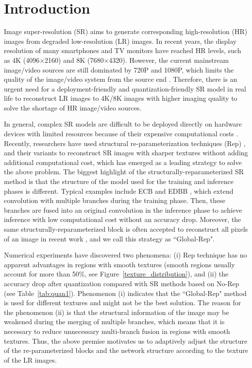\documentclass[sn-mathphys]{sn-jnl}%
\theoremstyle{thmstyleone}%
\theoremstyle{thmstyletwo}%
\theoremstyle{thmstylethree}%
\begin{document}
\maketitle

\section{Introduction}\label{sec1}
Image super-resolution (SR) aims to generate corresponding high-resolution (HR) images from degraded low-resolution (LR) images. In recent years, the display resolution of many smartphones and TV monitors have reached HR levels, such as 4K (4096$\times$2160) and 8K (7680$\times$4320). However, the current mainstream image/video sources are still dominated by 720P and 1080P, which limits the quality of the image/video system from the source end \cite{EGVSR,mobile2,mobile3,ARM}. Therefore, there is an urgent need for a deployment-friendly and quantization-friendly SR model in real life to reconstruct LR images to 4K/8K images with higher imaging quality to solve the shortage of HR image/video sources.

In general, complex SR models are difficult to be deployed directly on hardware devices with limited resources because of their expensive computational costs \cite{mobile1,RealBasicVSR,basicvsr++,CBAM,DRRN,RCAN,liu2022cross,yang2021image,MFFN}. Recently, researchers have used structural re-parameterization techniques (Rep) \cite{RepVGG,ACnet,DBB}, and their variants \cite{Dyrep,RepBN,ECB,EDBB,OREPA} to reconstruct SR images with sharper textures without adding additional computational cost, which has emerged as a leading strategy to solve the above problem. The biggest highlight of the structurally-reparameterized SR method is that the structure of the model used for the training and inference phases is different. Typical examples include ECB \cite{ECB} and EDBB \cite{EDBB}, which extend convolution with multiple branches during the training phase. Then, these branches are fused into an original convolution in the inference phase to achieve inference with low computational cost without an accuracy drop. Moreover, the same structurally-reparameterized block is often accepted to reconstruct all pixels of an image in recent work \cite{RepVGG,ACnet,DBB,ECB,EDBB,OREPA}, and we call this strategy as ``Global-Rep".

Numerical experiments have discovered two phenomena: (i) Rep technique has no apparent advantages in regions with smooth textures (smooth regions usually account for more than 50\%, see Figure~\ref{texture_distribution}), and (ii) the accuracy drop after quantization compared with SR methods based on No-Rep (see Table~\ref{tab:quan1}). Phenomenon (i) indicates that the ``Global-Rep" method is used for different textures and might not be the best solution. The reason for the phenomenon (ii) is that the structural information of the image may be weakened during the merging of multiple branches, which means that it is necessary to reduce unnecessary multi-branch fusion in regions with smooth textures. Thus, the above premise motivates us to adaptively adjust the structure of the re-parameterized blocks and the network structure according to the texture of the LR images.
\end{document}
